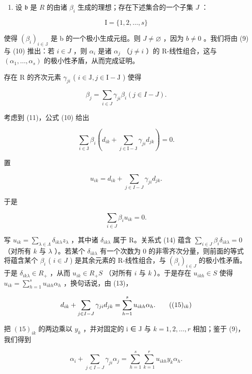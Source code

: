\begin{enumerate}
\def\labelenumi{\arabic{enumi})}
\setcounter{enumi}{1}
\tightlist
\item
  设 \(\mathfrak{b}\) 是 \(R\) 的由诸 \(\beta_{i}\) 生成的理想；存在下述集合的一个子集 \(J\) ：
\end{enumerate}

\[
\mathrm{I} = \{1, 2, \dots , s \}
\]

使得 \((\beta_{i})_{i\in\mathbb{J}}\) 是 b 的一个极小生成元组。则 \(J\neq\varnothing\) ，因为 \(b\neq0\) 。我们将由 (9) 与 (10) 推出：若 \(i\in J\) ，则 \(\alpha_{i}\) 是诸 \(\alpha_{j}\) （\(j\neq i\) ）的 R-线性组合，这与 \((\alpha_{1},\ldots,\alpha_{s})\) 的极小性矛盾，从而完成证明。

存在 R 的齐次元素 \(\gamma_{ji}\) ( \(i \in \mathrm{J}, j \in \mathrm{I} - \mathrm{J}\) ) 使得

\[
\beta_ {j} = \sum_ {i \in J} \gamma_ {j i} \beta_ {i} (j \in I - J).\tag{11}
\]

考虑到 (11)，公式 (10) 给出

\[
\sum_ {i \in \mathrm{J}} \beta_ {i} \left(d _ {i k} + \sum_ {j \in \mathrm{I} - \mathrm{J}} \gamma_ {j i} d _ {j k}\right) = 0.\tag{12}
\]

置

\[
u _ {i k} = d _ {i k} + \sum_ {j \in I - J} \gamma_ {j i} d _ {j k}.\tag{13}
\]

于是

\[
\sum_ {i \in J} \beta_ {i} u _ {i k} = 0.\tag{14}
\]

写 \(u_{ik} = \sum_{\lambda \in \Lambda} \delta_{ik\lambda} z_\lambda\) ，其中诸 \(\delta_{ik\lambda}\) 属于 R。关系式 (14) 蕴含 \(\sum_{i \in J} \beta_i \delta_{ik\lambda} = 0\) （对所有 \(k\) 与 \(\lambda\) ）。若某个 \(\delta_{ik\lambda}\) 有一个次数为 0 的非零齐次分量，则前面的等式将蕴含某个 \(\beta_i\) ( \(i \in J\) ) 是其余元素的 R-线性组合，与 \((\beta_i)_{i \in J}\) 的极小性矛盾。于是 \(\delta_{ik\lambda} \in R_+\) ，从而 \(u_{ik} \in R_+ S\) （对所有 \(i\) 与 \(k\) ）。于是存在 \(u_{ikh} \in S\) 使得 \(u_{ik} = \sum_{h=1}^{s} u_{ikh} \alpha_h\) ，换句话说，由 (13)，

\[
d _ {i k} + \sum_ {j \in I - J} \gamma_ {j i} d _ {j k} = \sum_ {h = 1} ^ {s} u _ {i k h} \alpha_ {h}.\tag{$(15)_{ik}$}
\]

把 \((15)_{ik}\) 的两边乘以 \(y_{k}\) ，并对固定的 i ∈ J 与 \(k = 1, 2, \ldots, r\) 相加；鉴于 (9)，我们得到

\[
\alpha_ {i} + \sum_ {j \in I - J} \gamma_ {j i} \alpha_ {j} = \sum_ {h = 1} ^ {s} \sum_ {k = 1} ^ {r} u _ {i k h} y _ {k} \alpha_ {h}.
\]

